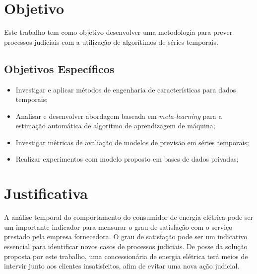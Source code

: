 \documentclass[../main.tex]{subfiles}
\begin{document}
\section{Objetivo}

Este trabalho tem como objetivo desenvolver uma metodologia para prever processos judiciais com a utilização de algorítimos de séries temporais.
\subsection{Objetivos Específicos}
\begin{itemize}
    \item Investigar e aplicar métodos de engenharia de características para dados temporais;
	\item Analisar e desenvolver abordagem baseada em \textit{meta-learning} para a estimação automática de algoritmo de aprendizagem de máquina;
	\item Investigar métricas de avaliação de modelos de previsão em séries temporais;
	\item Realizar experimentos com modelo proposto em bases de dados privadas;
\end{itemize}

\section{Justificativa}

A análise temporal do comportamento do consumidor de energia elétrica pode ser um importante indicador para mensurar o grau de satisfação com o serviço prestado pela empresa fornecedora. O grau de satisfação pode ser um indicativo essencial para identificar novos casos de processos judiciais. De posse da solução proposta por este trabalho, uma concessionária de energia elétrica terá meios de intervir junto aos clientes insatisfeitos, afim de evitar uma nova ação judicial.
\end{document}
